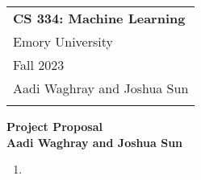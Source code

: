 \documentclass{article}
\begin{document}
\thispagestyle{empty}

\begin{tabular}{p{10.5cm}} 
	{\large \bf CS 334: Machine Learning} \\
	Emory University\\ Fall 2023  \\ Aadi Waghray and Joshua Sun\\
	\hline 
	\\
\end{tabular}

\vspace*{0.3cm}

\begin{center}
	{\Large \bf Project Proposal}\\
	\vspace*{0.02cm}
	{\bf Aadi Waghray and Joshua Sun}
\end{center}

\vspace{0.4cm}

\begin{enumerate}
	\item 
\end{enumerate}
\end{document}
